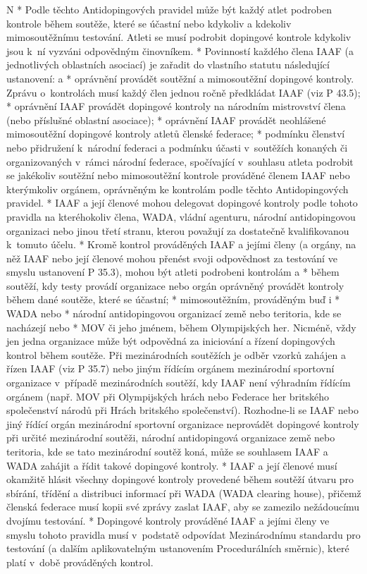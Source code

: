 \begitems \style N
* Podle těchto Antidopingových pravidel může být každý atlet podroben kontrole během soutěže, které se účastní nebo kdykoliv a kdekoliv mimosoutěžnímu testování. Atleti se musí podrobit dopingové kontrole kdykoliv jsou k~ní vyzváni odpovědným činovníkem.
* Povinností každého člena IAAF (a jednotlivých oblastních asociací) je zařadit do vlastního statutu následující ustanovení:
  \begitems \style a
  * oprávnění provádět soutěžní a mimosoutěžní dopingové kontroly. Zprávu o~kontrolách musí každý člen jednou ročně předkládat IAAF (viz P 43.5);
  * oprávnění IAAF provádět dopingové kontroly na národním mistrovství člena (nebo příslušné oblastní asociace);
  * oprávnění IAAF provádět neohlášené mimosoutěžní dopingové kontroly atletů členské federace;
  * podmínku členství nebo přidružení k~národní federaci a podmínku účasti v~soutěžích konaných či organizovaných v~rámci národní federace, spočívající v~souhlasu atleta podrobit se jakékoliv soutěžní nebo mimosoutěžní kontrole prováděné členem IAAF nebo kterýmkoliv orgánem, oprávněným ke kontrolám podle těchto Antidopingových pravidel.
  \enditems
* IAAF a její členové mohou delegovat dopingové kontroly podle tohoto pravidla na kteréhokoliv člena, WADA, vládní agenturu, národní antidopingovou organizaci nebo jinou třetí stranu, kterou považují za dostatečně kvalifikovanou k~tomuto účelu.
* Kromě kontrol prováděných IAAF a jejími členy (a orgány, na něž IAAF nebo její členové mohou přenést svoji odpovědnost za testování ve smyslu ustanovení P 35.3), mohou být atleti podrobeni kontrolám
  \begitems \style a
  * během soutěží, kdy testy provádí organizace nebo orgán oprávněný provádět kontroly během dané soutěže, které se účastní;
  * mimosoutěžním, prováděným buď
    \begitems \style i
    * WADA nebo
    * národní antidopingovou organizací země nebo teritoria, kde se nacházejí nebo 
    * MOV či jeho jménem, během Olympijských her.
    \enditems
  \enditems
Nicméně, vždy jen jedna organizace může být odpovědná za iniciování a řízení dopingových kontrol během soutěže. Při mezinárodních soutěžích je odběr vzorků zahájen a řízen IAAF (viz P 35.7) nebo jiným řídícím orgánem mezinárodní sportovní organizace v~případě mezinárodních soutěží, kdy IAAF není výhradním řídícím orgánem (např. MOV při Olympijských hrách nebo Federace her britského společenství národů při Hrách britského společenství). Rozhodne-li se IAAF nebo jiný řídící orgán mezinárodní sportovní organizace neprovádět dopingové kontroly při určité mezinárodní soutěži, národní antidopingová organizace země nebo teritoria, kde se tato mezinárodní soutěž koná, může se souhlasem IAAF a WADA zahájit a řídit takové dopingové kontroly.
* IAAF a její členové musí okamžitě hlásit všechny dopingové kontroly provedené během soutěží útvaru pro sbírání, třídění a distribuci informací při WADA (WADA clearing house), přičemž členská federace musí kopii své zprávy zaslat IAAF, aby se zamezilo nežádoucímu dvojímu testování.
* Dopingové kontroly prováděné IAAF a jejími členy ve smyslu tohoto pravidla musí v~podstatě odpovídat Mezinárodnímu standardu pro testování (a dalším aplikovatelným ustanovením Procedurálních směrnic), které platí v~době prováděných kontrol.

